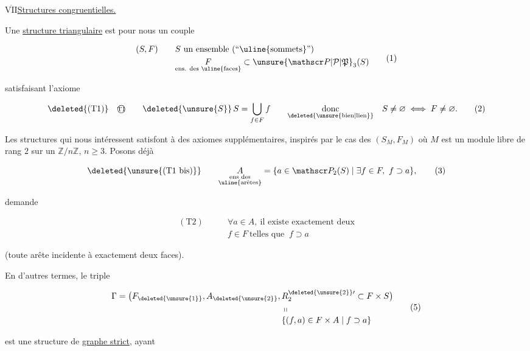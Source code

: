
\uline{$\overline{\mathrm{VII}}$}\quad\uline{Structures  congruentielles.}

Une \uline{structure triangulaire} est pour nous un couple

\[
\begin{aligned}
 (S,F)\qquad&S\text{ un ensemble (``\uline{sommets}'')}\\
 &\underset{\text{ens. des \uline{faces}}}{F}\subset\unsure{\mathscr P|\mathcal P|\mathfrak P}_3(S)
\end{aligned}\tag*{(1)}
\]

satisfaisant l'axiome

\[
\deleted{\text{(T1)}}\quad\text{\textcircled{\scriptsize T1}}\qquad\deleted{\unsure{S}}\,S=\bigcup_{f\in F}f
\qquad\underset{\deleted{\text{\unsure{bien|lien}}}}{\text{donc}}\quad S\ne\varnothing\iff F\ne\varnothing.\tag*{(2)}
\]

Les structures qui nous intéressent satisfont à des axiomes supplémentaires, inspirés par le cas des $(S_M,F_M)$ où $M$ est un module libre de rang $2$ sur un $\mathbb Z/n\mathbb Z$, $n\geq3$. Posons déjà

\[
\deleted{\text{\unsure{(T1 bis)}}}\qquad\underset{\substack{\text{ens des}\\\text{\uline{arêtes}}}}{A}=\{a\in\mathscr P_2(S)\mid\exists f\in F,\ f\supset a\},\tag*{(3)}
\]

 demande

\[
\begin{aligned}
 (\mathrm{T2})\qquad &\forall a\in A,\ \text{il existe exactement deux}\\
 &f\in F\ \text{telles que }\ f\supset a
\end{aligned}\tag*{(4)}
\]

(toute arête incidente à exactement deux faces).

En d'autres termes, le triple

\[
\begin{aligned}
 \Gamma=\bigl(F_{\deleted{\unsure{1}}},A_{\deleted{\unsure{2}}},{}&
 R_{2}^{\deleted{\unsure{2}}\prime}\subset F\times S\bigr)\\
 &\shortparallel\\[-2pt]
 &\{(f,a)\in F\times A\mid f\supset a\}
\end{aligned}\tag*{(5)}
\]

est une structure de \uline{graphe strict}, ayant
